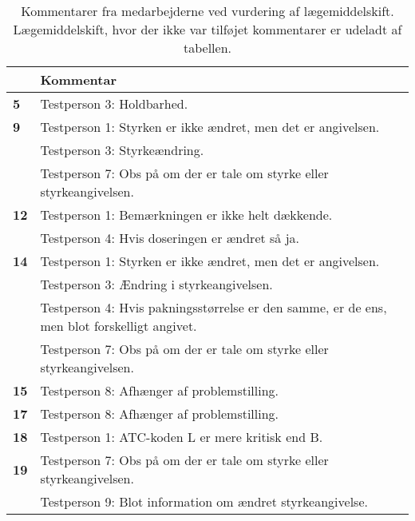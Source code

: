 \begin{longtable} {|p{2.2cm}|p{12cm}|}\caption{Kommentarer fra medarbejderne ved vurdering af lægemiddelskift. Lægemiddelskift, hvor der ikke var tilføjet kommentarer er udeladt af tabellen.}
	\label{table:resultat2} \\ \hline
	\rowcolor[HTML]{C0C0C0}{\textbf{Lægemiddel nummer}} & \textbf{Kommentar} \\\hline
	\cellcolor[HTML]{C0C0C0}\textbf{5} & Testperson 3: Holdbarhed. \\ \hline
\cellcolor[HTML]{C0C0C0}\textbf{9}\multirow{3}{*}{} & Testperson 1: Styrken er ikke ændret, men det er angivelsen.  \\\cline{2-2}
 \cellcolor[HTML]{C0C0C0}       & Testperson 3: Styrkeændring. \\ \cline{2-2}
     \cellcolor[HTML]{C0C0C0}             &Testperson 7: Obs på om der er tale om styrke eller styrkeangivelsen. \\ \hline
\cellcolor[HTML]{C0C0C0}\textbf{12}\multirow{2}{*}{} & Testperson 1: Bemærkningen er ikke helt dækkende.  \\ \cline{2-2}
\cellcolor[HTML]{C0C0C0}  & Testperson 4: Hvis doseringen er ændret så ja.  \\ \hline
\cellcolor[HTML]{C0C0C0}\textbf{14} \multirow{4}{*}{} &  Testperson 1: Styrken er ikke ændret, men det er angivelsen.  \\ \cline{2-2}
\cellcolor[HTML]{C0C0C0}			& Testperson 3: Ændring i styrkeangivelsen.  \\ \cline{2-2}
\cellcolor[HTML]{C0C0C0}                  & Testperson 4: Hvis pakningsstørrelse er den samme, er de ens, men blot forskelligt angivet. \\ \cline{2-2} \cellcolor[HTML]{C0C0C0} & Testperson 7: Obs på om der er tale om styrke eller styrkeangivelsen.  \\ \hline        
\cellcolor[HTML]{C0C0C0}\textbf{15}   & Testperson 8:  Afhænger af problemstilling.  \\ \hline
\cellcolor[HTML]{C0C0C0}\textbf{17} & Testperson 8:  Afhænger af problemstilling.  \\ \hline
\cellcolor[HTML]{C0C0C0}\textbf{18} & Testperson 1: ATC-koden L er mere kritisk end B. \\ \hline 
\cellcolor[HTML]{C0C0C0}\textbf{19}\multirow{2}{*}{} & Testperson 7: Obs på om der er tale om styrke eller styrkeangivelsen. \\ \cline{2-2}
\cellcolor[HTML]{C0C0C0}  & Testperson 9: Blot information om ændret styrkeangivelse. \\ \hline

\end{longtable}
